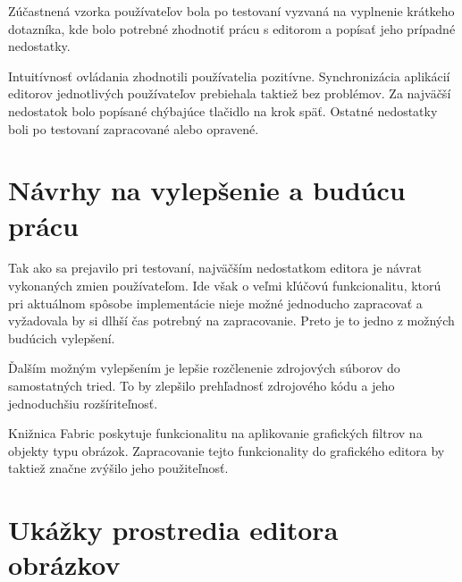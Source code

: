 Zúčastnená vzorka používateľov bola po testovaní vyzvaná na vyplnenie krátkeho dotazníka, kde bolo potrebné zhodnotiť prácu s editorom a popísať jeho prípadné nedostatky. 

Intuitívnosť ovládania zhodnotili používatelia pozitívne. Synchronizácia aplikácií editorov jednotlivých používateľov prebiehala taktiež bez problémov. Za najväčší nedostatok bolo popísané chýbajúce tlačidlo na krok späť. Ostatné nedostatky boli po testovaní zapracované alebo opravené.

\section{Návrhy na vylepšenie a budúcu prácu}
Tak ako sa prejavilo pri testovaní, najväčším nedostatkom editora je návrat vykonaných zmien používateľom. Ide však o veľmi kľúčovú funkcionalitu, ktorú pri aktuálnom spôsobe implementácie nieje možné jednoducho zapracovať a vyžadovala by si dlhší čas potrebný na zapracovanie. Preto je to jedno z možných budúcich vylepšení. 

Ďalším možným vylepšením je lepšie rozčlenenie zdrojových súborov do samostatných tried. To by zlepšilo prehľadnosť zdrojového kódu a jeho jednoduchšiu rozšíriteľnosť. 

Knižnica Fabric poskytuje funkcionalitu na aplikovanie grafických filtrov na objekty typu obrázok. Zapracovanie tejto funkcionality do grafického editora by taktiež značne zvýšilo jeho použiteľnosť.

\section{Ukážky prostredia editora obrázkov}

